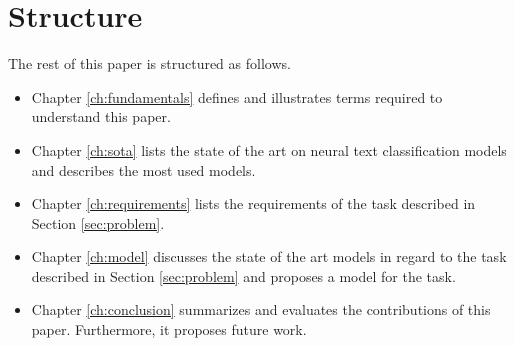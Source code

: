 \section{Structure}
The rest of this paper is structured as follows. 
\begin{itemize}
	\item Chapter \ref{ch:fundamentals} defines and illustrates terms required to understand this paper.
	\item Chapter \ref{ch:sota} lists the state of the art on neural text classification models and describes the most used models.
	\item Chapter \ref{ch:requirements} lists the requirements of the task described in Section \ref{sec:problem}.
	\item Chapter \ref{ch:model} discusses the state of the art models in regard to the task described in Section \ref{sec:problem} and proposes a model for the task.
	\item Chapter \ref{ch:conclusion} summarizes and evaluates the contributions of this paper. Furthermore, it proposes future work.
\end{itemize} 